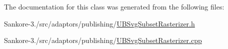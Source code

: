 The documentation for this class was generated from the following files\-:\begin{DoxyCompactItemize}
\item 
Sankore-\/3./src/adaptors/publishing/\hyperlink{_u_b_svg_subset_rasterizer_8h}{U\-B\-Svg\-Subset\-Rasterizer.\-h}\item 
Sankore-\/3./src/adaptors/publishing/\hyperlink{_u_b_svg_subset_rasterizer_8cpp}{U\-B\-Svg\-Subset\-Rasterizer.\-cpp}\end{DoxyCompactItemize}
